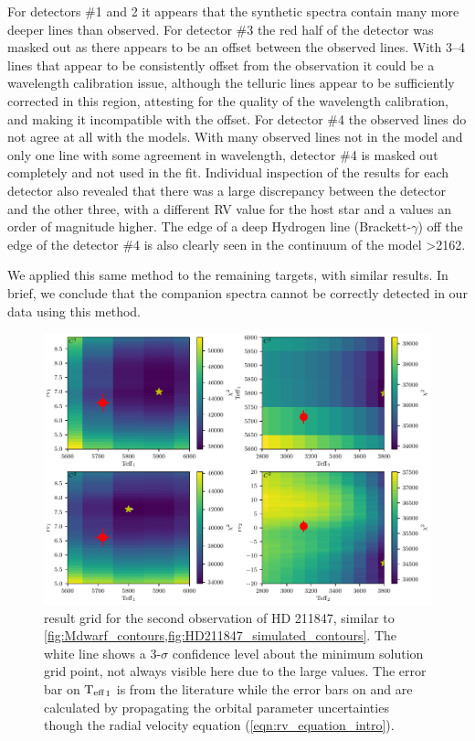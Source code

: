 For detectors \#1 and 2 it appears that the synthetic spectra contain many more deeper lines than observed.
For detector \#3 the red half of the detector was masked out as there appears to be an offset between the observed lines.
With 3--4 lines that appear to be consistently offset from the observation it could be a wavelength calibration issue, although the telluric lines appear to be sufficiently corrected in this region, attesting for the quality of the wavelength calibration, and making it incompatible with the offset.
For detector \#4 the observed lines do not agree at all with the models.
With many observed lines not in the model and only one line with some agreement in wavelength, detector \#4 is masked out completely and not used in the \textchisquared{} fit.
Individual inspection of the \textchisquared{} results for each detector also revealed that there was a large discrepancy between the  detector and the other three, with a different {RV} value for the host star and a \textchisquared{} values an order of magnitude higher.
The edge of a deep Hydrogen line (Brackett-\(\gamma\)) off the edge of the detector \#4 is also clearly seen in the continuum of the model >2162\nm{}.

We applied this same method to the remaining targets, with similar results.
In brief, we conclude that the companion spectra cannot be correctly detected in our data using this method.

\begin{figure}
    \centering
    \includegraphics[width=0.7\linewidth]{figures/companion_recovery/HD211847_result_pcolors}
    \caption[\textchisquared{} contour for an observation {HD 211847}.]{\textchisquared{} result grid for the second observation of {HD 211847}, similar to \cref{fig:Mdwarf_contours,fig:HD211847_simulated_contours}.
        The white line shows a 3-\(\sigma\) confidence level about the minimum \textchisquared{} solution grid point, not always visible here due to the large \textchisquared{} values.
        The error bar on \({\textrm{T}_{\mathrm{eff}}}_{1}\) is from the literature while the error bars on \Rvone{} and \Rvtwo{} are calculated by propagating the orbital parameter uncertainties though the radial velocity equation (\cref{eqn:rv_equation_intro}).}
    \label{fig:HD211847_result_contours}
\end{figure}

